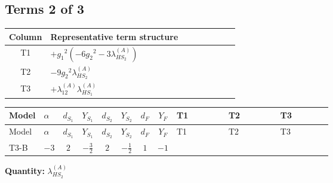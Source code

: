 \documentclass[8pt]{article}
\begin{document}
\begin{landscape}
\subsection*{Terms 2 of 3}
\begin{center}
\begin{tabular}{@{}c >{\raggedright\arraybackslash}p{0.82\linewidth}@{}}
\toprule
Column & Representative term structure \\
\midrule
T1 & \(\displaystyle +{g_1}^2 \left(-6 {g_2}^2-3 {\lambda_{HS_2}^{(A)}}\right)\) \\
\midrule
T2 & \(\displaystyle -9 {g_2}^2 {\lambda_{HS_2}^{(A)}}\) \\
\midrule
T3 & \(\displaystyle +{\lambda_{12}^{(A)}} {\lambda_{HS_1}^{(A)}}\) \\
\midrule
\bottomrule
\end{tabular}
\end{center}
\smallskip
\tiny
\begin{longtable}{@{}llcccccc >{\raggedright\arraybackslash}p{0.21\linewidth} >{\raggedright\arraybackslash}p{0.21\linewidth} >{\raggedright\arraybackslash}p{0.21\linewidth}@{}}
\toprule
Model & $\alpha$ & $d_{S_1}$ & $Y_{S_1}$ & $d_{S_2}$ & $Y_{S_2}$ & $d_F$ & $Y_F$ & T1 & T2 & T3 \\
\midrule
\endfirsthead
\toprule
Model & $\alpha$ & $d_{S_1}$ & $Y_{S_1}$ & $d_{S_2}$ & $Y_{S_2}$ & $d_F$ & $Y_F$ & T1 & T2 & T3 \\
\midrule
\endhead
T3-B & $-3$ & $2$ & $-\frac{3}{2}$ & $2$ & $-\frac{1}{2}$ & $1$ & $-1$ & \scriptsize\adjustbox{max width=\linewidth}{$\begin{gathered} +{g_1}^2 \left(-6 {g_2}^2-3 {\lambda_{HS_2}^{(A)}}\right)\end{gathered}$} & \scriptsize\adjustbox{max width=\linewidth}{$\begin{gathered} -9 {g_2}^2 {\lambda_{HS_2}^{(A)}}\end{gathered}$} & \scriptsize\adjustbox{max width=\linewidth}{$\begin{gathered} +{\lambda_{12}^{(A)}} {\lambda_{HS_1}^{(A)}}\end{gathered}$} \\
\midrule
\bottomrule
\end{longtable}
\clearpage
\noindent\textbf{Quantity: }$\lambda_{HS_2}^{(A)}$\par\smallskip

\end{landscape}
\end{document}
